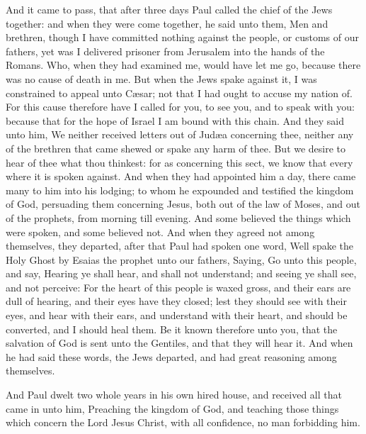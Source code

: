  And it came to pass, that after three days Paul called
the chief of the Jews together: and when they were come together, he
said unto them, Men and brethren, though I have committed nothing
against the people, or customs of our fathers, yet was I delivered
prisoner from Jerusalem into the hands of the Romans. 
Who, when they had examined me, would have let me go, because there was
no cause of death in me.  But when the Jews spake against
it, I was constrained to appeal unto Cæsar; not that I had ought to
accuse my nation of.  For this cause therefore have I
called for you, to see you, and to speak with you: because that for the
hope of Israel I am bound with this chain.  And they said
unto him, We neither received letters out of Judæa concerning thee,
neither any of the brethren that came shewed or spake any harm of thee.
 But we desire to hear of thee what thou thinkest: for as
concerning this sect, we know that every where it is spoken against.
 And when they had appointed him a day, there came many
to him into his lodging; to whom he expounded and testified the kingdom
of God, persuading them concerning Jesus, both out of the law of Moses,
and out of the prophets, from morning till evening.  And
some believed the things which were spoken, and some believed not.
 And when they agreed not among themselves, they
departed, after that Paul had spoken one word, Well spake the Holy Ghost
by Esaias the prophet unto our fathers,  Saying, Go unto
this people, and say, Hearing ye shall hear, and shall not understand;
and seeing ye shall see, and not perceive:  For the heart
of this people is waxed gross, and their ears are dull of hearing, and
their eyes have they closed; lest they should see with their eyes, and
hear with their ears, and understand with their heart, and should be
converted, and I should heal them.  Be it known therefore
unto you, that the salvation of God is sent unto the Gentiles, and that
they will hear it.  And when he had said these words, the
Jews departed, and had great reasoning among themselves.

 And Paul dwelt two whole years in his own hired house,
and received all that came in unto him,  Preaching the
kingdom of God, and teaching those things which concern the Lord Jesus
Christ, with all confidence, no man forbidding him.
